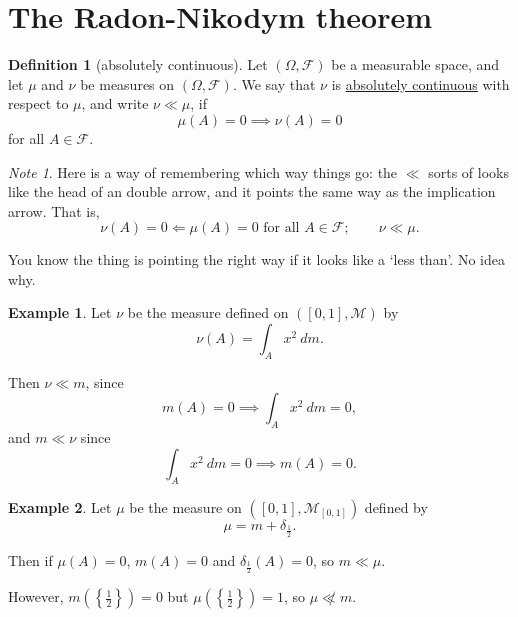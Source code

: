 \documentclass[a4paper]{scrartcl}
\newcommand{\defn}[1]{\ul{#1}}
\theoremstyle{definition}
\newtheorem{definition}{Definition}[section]
\newtheorem{example}{Example}[section]
\theoremstyle{plain}
\theoremstyle{remark}
\newtheorem{note}{Note}[section]
\begin{document}
\section{The Radon-Nikodym theorem}
\begin{definition}[absolutely continuous]
  \label{def:absolutelycontinuous}
  Let $(\Omega, \mathcal{F})$ be a measurable space, and let $\mu$ and $\nu$ be measures on $(\Omega, \mathcal{F})$. We say that $\nu$ is \defn{absolutely continuous} with respect to $\mu$, and write $\nu \ll \mu$, if
  \begin{equation*}
    \mu(A) = 0 \implies \nu(A) = 0
  \end{equation*}
  for all $A \in \mathcal{F}$.
\end{definition}

\begin{note}
  Here is a way of remembering which way things go: the $\ll$ sorts of looks like the head of an double arrow, and it points the same way as the implication arrow. That is,
  \begin{equation*}
    \nu(A) = 0 \Longleftarrow \mu(A) = 0 \text{ for all }A \in \mathcal{F};\qquad \nu \ll \mu.
  \end{equation*}

  You know the thing is pointing the right way if it looks like a `less than'. No idea why.
\end{note}

\begin{example}
  Let $\nu$ be the measure defined on $([0, 1], \mathcal{M})$ by
  \begin{equation*}
    \nu(A) = \int_{A} x^{2}\ dm.
  \end{equation*}

  Then $\nu \ll m$, since
  \begin{equation*}
    m(A) = 0 \implies \int_{A} x^{2}\ dm = 0,
  \end{equation*}
  and $m \ll \nu$ since
  \begin{equation*}
    \int_{A} x^{2}\ dm = 0 \implies m(A) = 0.
  \end{equation*}
\end{example}

\begin{example}
  Let $\mu$ be the measure on $([0, 1], \mathcal{M}_{[0, 1]})$ defined by
  \begin{equation*}
    \mu = m + \delta_{\frac{1}{2}}.
  \end{equation*}

  Then if $\mu(A) = 0$, $m(A) = 0$ and $\delta_{\frac{1}{2}}(A) = 0$, so $m \ll \mu$.

  However, $m\left( \left\{ \frac{1}{2} \right\} \right) = 0$ but $\mu\left( \left\{ \frac{1}{2} \right\} \right) = 1$, so $\mu \not\ll m$.
\end{example}
\end{document}
